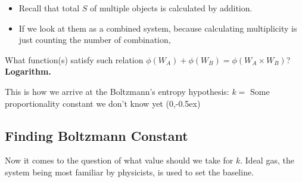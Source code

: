 \documentclass[class=article, crop=false, 12pt]{standalone}
\begin{document}
\begin{itemize}
    \item Recall that total $S$ of multiple objects is calculated by addition.

    \item If we look at them as a combined system,
    because calculating multiplicity is just counting the number of combination,
\end{itemize}

What function(s) satisfy such relation $\phi(W_A)+\phi(W_B) = \phi(W_A\times W_B)$?
\bf{Logarithm}.

This is how we arrive at the Boltzmann's entropy hypothesis:
{$k =$ Some proportionality constant we don't know yet}
{(0,-0.5ex)}


\subsection{Finding Boltzmann Constant}

Now it comes to the question of what value should we take for $k$. 
Ideal gas, the system being most familiar by physicists, 
is used to set the baseline. 
\end{document}
